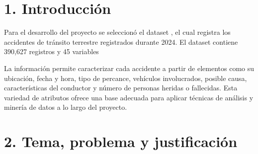\documentclass[11pt,letterpaper]{article}
\begin{document}

\clearpage
{}

\section*{1. Introducción}

\begin{nota}
Para el desarrollo del proyecto se seleccionó el dataset
, el cual registra los accidentes de tránsito
terrestre registrados durante 2024. El dataset contiene 390,627
registros y 45 variables

La información permite caracterizar cada accidente a partir de elementos como su
ubicación, fecha y hora, tipo de percance, vehículos involucrados, posible causa, características del conductor y número de personas heridas o
fallecidas. Esta variedad de atributos ofrece una base adecuada para aplicar
técnicas de análisis y minería de datos a lo largo del proyecto.
\end{nota}

\section*{2. Tema, problema y justificación}
\end{document}
